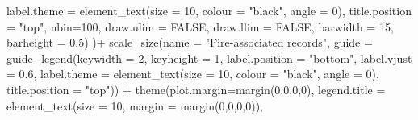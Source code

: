 \documentclass[
]{book}
\newenvironment{Shaded}{\begin{snugshade}}{\end{snugshade}}
\newcommand{\AttributeTok}[1]{\textcolor[rgb]{0.77,0.63,0.00}{#1}}
\newcommand{\ConstantTok}[1]{\textcolor[rgb]{0.00,0.00,0.00}{#1}}
\newcommand{\DecValTok}[1]{\textcolor[rgb]{0.00,0.00,0.81}{#1}}
\newcommand{\FloatTok}[1]{\textcolor[rgb]{0.00,0.00,0.81}{#1}}
\newcommand{\FunctionTok}[1]{\textcolor[rgb]{0.00,0.00,0.00}{#1}}
\newcommand{\NormalTok}[1]{#1}
\newcommand{\SpecialCharTok}[1]{\textcolor[rgb]{0.00,0.00,0.00}{#1}}
\newcommand{\StringTok}[1]{\textcolor[rgb]{0.31,0.60,0.02}{#1}}
\begin{document}
\begin{Shaded}
\begin{Highlighting}[]
                                                \AttributeTok{label.theme =} \FunctionTok{element\_text}\NormalTok{(}\AttributeTok{size =} \DecValTok{10}\NormalTok{,}
                                                                           \AttributeTok{colour =} \StringTok{"black"}\NormalTok{,}
                                                                           \AttributeTok{angle =} \DecValTok{0}\NormalTok{),}
                                                \AttributeTok{title.position =} \StringTok{"top"}\NormalTok{,}
                                                \AttributeTok{nbin=}\DecValTok{100}\NormalTok{,}
                                                \AttributeTok{draw.ulim =} \ConstantTok{FALSE}\NormalTok{,}
                                                \AttributeTok{draw.llim =} \ConstantTok{FALSE}\NormalTok{,}
                                                \AttributeTok{barwidth =} \DecValTok{15}\NormalTok{,}
                                                \AttributeTok{barheight =} \FloatTok{0.5}\NormalTok{)}
\NormalTok{  )}\SpecialCharTok{+}
  \FunctionTok{scale\_size}\NormalTok{(}\AttributeTok{name =} \StringTok{"Fire{-}associated records"}\NormalTok{,}
             \AttributeTok{guide =} \FunctionTok{guide\_legend}\NormalTok{(}\AttributeTok{keywidth =} \DecValTok{2}\NormalTok{,}
                                  \AttributeTok{keyheight =} \DecValTok{1}\NormalTok{,}
                                  \AttributeTok{label.position =} \StringTok{"bottom"}\NormalTok{,}
                                  \AttributeTok{label.vjust =} \FloatTok{0.6}\NormalTok{,}
                                  \AttributeTok{label.theme =} \FunctionTok{element\_text}\NormalTok{(}\AttributeTok{size =} \DecValTok{10}\NormalTok{,}
                                                             \AttributeTok{colour =} \StringTok{"black"}\NormalTok{,}
                                                             \AttributeTok{angle =} \DecValTok{0}\NormalTok{),}
                                  \AttributeTok{title.position =} \StringTok{"top"}\NormalTok{)) }\SpecialCharTok{+}
  \FunctionTok{theme}\NormalTok{(}\AttributeTok{plot.margin=}\FunctionTok{margin}\NormalTok{(}\DecValTok{0}\NormalTok{,}\DecValTok{0}\NormalTok{,}\DecValTok{0}\NormalTok{,}\DecValTok{0}\NormalTok{),}
        \AttributeTok{legend.title =} \FunctionTok{element\_text}\NormalTok{(}\AttributeTok{size =} \DecValTok{10}\NormalTok{, }\AttributeTok{margin =} \FunctionTok{margin}\NormalTok{(}\DecValTok{0}\NormalTok{,}\DecValTok{0}\NormalTok{,}\DecValTok{0}\NormalTok{,}\DecValTok{0}\NormalTok{)),}

\end{Highlighting}
\end{Shaded}
\end{document}
